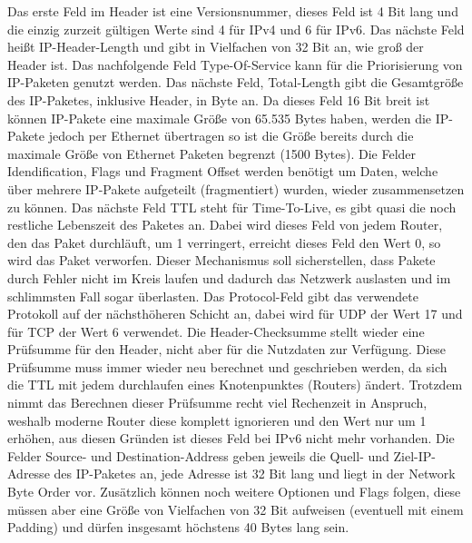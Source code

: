\documentclass[a4paper,14pt,headsepline]{scrartcl}
\begin{document}
Das erste Feld im Header ist eine Versionsnummer, dieses Feld ist 4 Bit lang und die einzig zurzeit gültigen Werte sind 4 für IPv4 und 6 für IPv6. Das nächste Feld heißt IP-Header-Length und gibt in Vielfachen von 32 Bit an, wie groß der Header ist. Das nachfolgende Feld Type-Of-Service kann für die Priorisierung von IP-Paketen genutzt werden. Das nächste Feld, Total-Length gibt die Gesamtgröße des IP-Paketes, inklusive Header, in Byte an. Da dieses Feld 16 Bit breit ist können IP-Pakete eine maximale Größe von 65.535 Bytes haben, werden die IP-Pakete jedoch per Ethernet übertragen so ist die Größe bereits durch die maximale Größe von Ethernet Paketen begrenzt (1500 Bytes). Die Felder Idendification, Flags und Fragment Offset werden benötigt um Daten, welche über mehrere IP-Pakete aufgeteilt (fragmentiert) wurden, wieder zusammensetzen zu können. Das nächste Feld TTL steht für Time-To-Live, es gibt quasi die noch restliche Lebenszeit des Paketes an. Dabei wird dieses Feld von jedem Router, den das Paket durchläuft, um 1 verringert, erreicht dieses Feld den Wert 0, so wird das Paket verworfen. Dieser Mechanismus soll sicherstellen, dass Pakete durch Fehler nicht im Kreis laufen und dadurch das Netzwerk auslasten und im schlimmsten Fall sogar überlasten. Das Protocol-Feld gibt das verwendete Protokoll auf der nächsthöheren Schicht an, dabei wird für UDP der Wert 17 und für TCP der Wert 6 verwendet. Die Header-Checksumme stellt wieder eine Prüfsumme für den Header, nicht aber für die Nutzdaten zur Verfügung. Diese Prüfsumme muss immer wieder neu berechnet und geschrieben werden, da sich die TTL mit jedem durchlaufen eines Knotenpunktes (Routers) ändert. Trotzdem nimmt das Berechnen dieser Prüfsumme recht viel Rechenzeit in Anspruch, weshalb moderne Router diese komplett ignorieren und den Wert nur um 1 erhöhen, aus diesen Gründen ist dieses Feld bei IPv6 nicht mehr vorhanden. Die Felder Source- und Destination-Address geben jeweils die Quell- und Ziel-IP-Adresse des IP-Paketes an, jede Adresse ist 32 Bit lang und liegt in der Network Byte Order vor. Zusätzlich können noch weitere Optionen und Flags folgen, diese müssen aber eine Größe von Vielfachen von 32 Bit aufweisen (eventuell mit einem Padding) und dürfen insgesamt höchstens 40 Bytes lang sein.

\newpage
\end{document}
